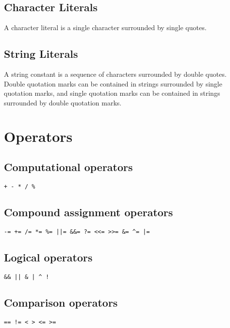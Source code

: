 \documentclass[10pt]{report}
\begin{document}
\subsection{Character Literals}
\label{sec:char_lit}

A character literal is a single character surrounded by single quotes.

\subsection{String Literals}
\label{sec:str_lit}

A string constant is a sequence of characters surrounded by double quotes. Double quotation marks can be contained in strings surrounded by single quotation marks, and single quotation marks can be contained in strings surrounded by double quotation marks.


\section{Operators}
\label{sec:operators}

\subsection{Computational operators}
\begin{verbatim}
+ - * / %
\end{verbatim}


\subsection{Compound assignment operators}
\begin{verbatim}
-= += /= *= %= ||= &&= ?= <<= >>= &= ^= |=
\end{verbatim}

\subsection{Logical operators}
\begin{verbatim}
&& || & | ^ !
\end{verbatim}

\subsection{Comparison operators}
\begin{verbatim}
== != < > <= >=
\end{verbatim}
\end{document}
